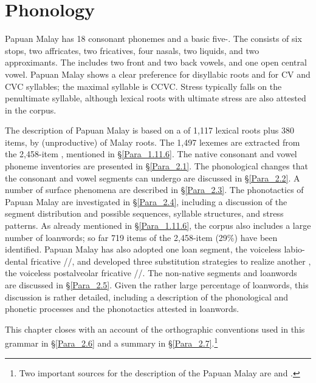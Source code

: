 \chapter[Phonology]{Phonology\label{Para_2}}

Papuan Malay has 18 consonant phonemes and a basic five-. The  consists of six stops, two affricates, two fricatives, four nasals, two liquids, and two approximants. The  includes two front and two back vowels, and one open central vowel. Papuan Malay shows a clear preference for disyllabic roots and for CV and CVC syllables; the maximal syllable is CCVC. Stress typically falls on the penultimate syllable, although lexical roots with ultimate stress are also attested in the corpus.



The description of Papuan Malay  is based on a  of 1,117 lexical roots plus 380 items,  by (unproductive)  of Malay roots. The 1,497 lexemes are extracted from the 2,458-item , mentioned in §\ref{Para_1.11.6}. The native consonant and vowel phoneme inventories are presented in §\ref{Para_2.1}. The phonological changes that the consonant and vowel segments can undergo are discussed in §\ref{Para_2.2}. A number of surface phenomena are described in §\ref{Para_2.3}. The phonotactics of Papuan Malay are investigated in §\ref{Para_2.4}, including a discussion of the segment distribution and possible sequences, syllable structures, and stress patterns. As already mentioned in §\ref{Para_1.11.6}, the corpus also includes a large number of loanwords; so far 719 items of the 2,458-item  (29\%) have been identified. Papuan Malay has also adopted one loan segment, the voiceless labio-dental fricative //, and developed three substitution strategies to realize another , the voiceless postalveolar fricative //. The non-native segments and loanwords are discussed in §\ref{Para_2.5}. Given the rather large percentage of loanwords, this discussion is rather detailed, including a description of the phonological and phonetic processes and the phonotactics attested in loanwords.



This chapter closes with an account of the orthographic conventions used in this grammar in §\ref{Para_2.6} and a summary in §\ref{Para_2.7}.\footnote{Two important sources for the description of the Papuan Malay  are \citet{Donohue.2003} and \citet{SutriNarfafan.underreview}.}


